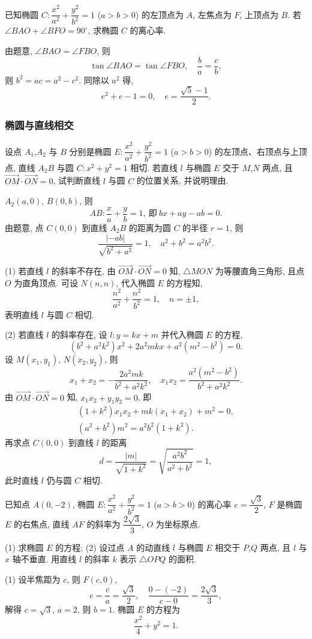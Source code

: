 \begin{exercise}
    已知椭圆 $C\colon \dfrac{x^2}{a^2}+\dfrac{y^2}{b^2}=1$ ($a>b>0$) 的左顶点为 $A$, 左焦点为 $F$, 上顶点为 $B$. 若 $\angle BAO+\angle BFO=90^\circ$, 求椭圆 $C$ 的离心率.
\end{exercise}
\beginsolution
    由题意, $\angle BAO= \angle FBO$, 则
    \[\tan\angle BAO= \tan\angle FBO,\quad 
    \frac{b}a= \frac{c}b,\]
    则 $b^2= ac= a^2-c^2$. 同除以 $a^2$ 得,
    \[e^2+e-1=0,\quad e=\frac{\sqrt5-1}{2}.\]
\endsolution

\subsubsection{椭圆与直线相交}
\begin{example}
    设点 $A_1$,$A_2$ 与 $B$ 分别是椭圆 $E\colon \dfrac{x^2}{a^2}+\dfrac{y^2}{b^2}=1$ ($a>b>0$) 的左顶点、右顶点与上顶点, 直线 $A_2 B$ 与圆 $C\colon x^2+y^2 =1$ 相切. 若直线 $l$ 与椭圆 $E$ 交于 $M$,$N$ 两点, 且 $\overrightarrow{OM}\cdot \overrightarrow{ON}=0$, 试判断直线 $l$ 与圆 $C$ 的位置关系, 并说明理由.
\end{example}
\beginsolution
    $A_2(a,0)$, $B(0,b)$, 则
    \[AB\colon \frac{x}a+ \frac{y}b= 1,\ \text{即}\ 
    bx+ay-ab=0.\]
    由题意, 点 $C(0,0)$ 到直线 $A_2B$ 的距离为圆 $C$ 的半径 $r=1$, 则
    \[\frac{|-ab|}{\sqrt{b^2+a^2}}= 1,\quad
    a^2+b^2= a^2b^2.\]

    (1) 若直线 $l$ 的斜率不存在, 由 $\overrightarrow{OM}\cdot \overrightarrow{ON}=0$ 知, $\triangle MON$ 为等腰直角三角形, 且点 $O$ 为直角顶点. 可设 $N(n,n)$, 代入椭圆 $E$ 的方程知, 
    \[\frac{n^2}{a^2}+ \frac{n^2}{b^2}= 1,\quad n= \pm1,\]
    表明直线 $l$ 与圆 $C$ 相切.

    (2) 若直线 $l$ 的斜率存在, 设 $l\colon y=kx+m$ 并代入椭圆 $E$ 的方程,
    \[(b^2+ a^2 k^2)x^2+ 2a^2mkx+ a^2(m^2-b^2)= 0.\]
    设 $M(x_1,y_1)$, $N(x_2,y_2)$, 则
    \[x_1+x_2= -\frac{2a^2mk}{b^2+ a^2 k^2},\quad
    x_1x_2= \frac{a^2(m^2-b^2)}{b^2+ a^2 k^2}.\]
    由 $\overrightarrow{OM}\cdot \overrightarrow{ON}=0$ 知, $x_1x_2+y_1y_2= 0$, 即
    \[\begin{gathered}
        (1+k^2)x_1x_2+ mk(x_1+x_2)+ m^2= 0,\\
        (a^2+b^2)m^2= a^2b^2(1+k^2).
    \end{gathered}\]
    再求点 $C(0,0)$ 到直线 $l$ 的距离
    \[d= \frac{|m|}{\sqrt{1+k^2}}= \sqrt{\frac{a^2b^2}{a^2+b^2}}=1,\]
    此时直线 $l$ 仍与圆 $C$ 相切.
\endsolution

\lianxi
\begin{exercise}[s]
    已知点 $A(0,-2)$, 椭圆 $E\colon \dfrac{x^2}{a^2}+\dfrac{y^2}{b^2}=1$ ($a>b>0$) 的离心率 $e=\dfrac{\sqrt3}2$, $F$ 是椭圆 $E$ 的右焦点, 直线 $AF$ 的斜率为 $\dfrac{2\sqrt3}3$, $O$ 为坐标原点.
    
    (1) 求椭圆 $E$ 的方程;\qquad
    (2) 设过点 $A$ 的动直线 $l$ 与椭圆 $E$ 相交于 $P$,$Q$ 两点, 且 $l$ 与 $x$ 轴不垂直. 用直线 $l$ 的斜率 $k$ 表示 $\triangle OPQ$ 的面积.
\end{exercise}
\beginsolution
    (1) 设半焦距为 $c$, 则 $F(c,0)$,
    \[e= \frac{c}a= \frac{\sqrt3}2,\quad
    \frac{0-(-2)}{c-0}= \frac{2\sqrt3}3,\]
    解得 $c=\sqrt3$, $a=2$, 则 $b=1$. 椭圆 $E$ 的方程为
    \[\frac{x^2}4+ y^2= 1.\]

